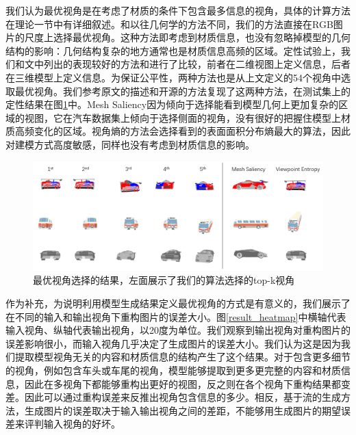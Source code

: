 \documentclass[UTF8,openany,AutoFakeBold,AutoFakeSlant,cs4size]{ctexbook}
\begin{document}
我们认为最优视角是在考虑了材质的条件下包含最多信息的视角，具体的计算方法在理论一节中有详细叙述。和以往几何学的方法不同，我们的方法直接在RGB图片的尺度上选择最优视角。这种方法即考虑到材质信息，也没有忽略掉模型的几何结构的影响：几何结构复杂的地方通常也是材质信息高频的区域。定性试验上，我们和\cite{Dutagaci2010ABF}文中列出的表现较好的方法\cite{Vzquez2003AutomaticVS}和\cite{Lee2005MeshS}进行了比较，前者在二维视图上定义信息，后者在三维模型上定义信息。为保证公平性，两种方法也是从上文定义的54个视角中选取最优视角。我们参考原文的描述和开源的方法复现了这两种方法，在测试集上的定性结果在图\ref{result_bestview}中。Mesh Saliency\cite{Lee2005MeshS}因为倾向于选择能看到模型几何上更加复杂的区域的视图，它在汽车数据集上倾向于选择侧面的视角，没有很好的把握住模型上材质高频变化的区域。视角熵\cite{Vzquez2003AutomaticVS}的方法会选择看到的表面面积分布熵最大的算法，因此对建模方式高度敏感，同样也没有考虑到材质信息的影响。

\begin{figure}
\centering
\includegraphics[width=\linewidth]{./images/best_viewpoint_thesis.png}
\caption{最优视角选择的结果，左面展示了我们的算法选择的top-k视角}
\label{result_bestview}
\end{figure}


作为补充，为说明利用模型生成结果定义最优视角的方式是有意义的，我们展示了在不同的输入和输出视角下重构图片的误差大小。图\ref{result_heatmap}中横轴代表输入视角、纵轴代表输出视角，以20度为单位。我们观察到输出视角对重构图片的误差影响很小，而输入视角几乎决定了生成图片的误差大小。我们认为这是因为我们提取模型视角无关的内容和材质信息的结构产生了这个结果。对于包含更多细节的视角，例如包含车头或车尾的视角，模型能够提取到更多更完整的内容和材质信息，因此在多视角下都能够重构出更好的视图，反之则在各个视角下重构结果都变差。因此可以通过重构误差来反推出视角包含信息的多少。相反，基于流的生成方法，生成图片的误差取决于输入输出视角之间的差距，不能够用生成图片的期望误差来评判输入视角的好坏。
\end{document}
